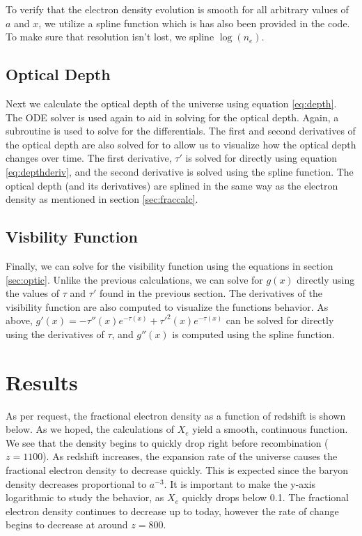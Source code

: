 \documentclass[twoside]{article}
\begin{document}
To verify that the electron density evolution is smooth for all arbitrary values of $a$ and $x$, we utilize a spline function which is has also been provided in the code. To make sure that resolution isn't lost, we spline $\log(n_e)$.

\subsection{Optical Depth}\label{sec:optcalc}

Next we calculate the optical depth of the universe using equation \ref{eq:depth}. The ODE solver is used again to aid in solving for the optical depth. Again, a subroutine is used to solve for the differentials. The first and second derivatives of the optical depth are also solved for to allow us to visualize how the optical depth changes over time. The first derivative, $\tau'$ is solved for directly using equation \ref{eq:depthderiv}, and the second derivative is solved using the spline function. The optical depth (and its derivatives) are splined in the same way as the electron density as mentioned in section \ref{sec:fraccalc}.

\clearpage

\subsection{Visbility Function}\label{sec:viscalc}

Finally, we can solve for the visibility function using the equations in section \ref{sec:optic}. Unlike the previous calculations, we can solve for $g(x)$ directly using the values of $\tau$ and $\tau'$ found in the previous section. The derivatives of the visibility function are also computed to visualize the functions behavior. As above, $g'(x) = -\tau''(x)e^{-\tau(x)}+\tau'^2(x)e^{-\tau(x)}$ can be solved for directly using the derivatives of $\tau$, and $g''(x)$ is computed using the spline function.

\clearpage

\section{Results}\label{sec:results}

As per request, the fractional electron density as a function of redshift is shown below. As we hoped, the calculations of $X_e$ yield a smooth, continuous function. We see that the density begins to quickly drop right before recombination ($z = 1100$). As redshift increases, the expansion rate of the universe causes the fractional electron density to decrease quickly. This is expected since the baryon density decreases proportional to $a^{-3}$. It is important to make the y-axis logarithmic to study the behavior, as $X_e$ quickly drops below 0.1. The fractional electron density continues to decrease up to today, however the rate of change begins to decrease at around $z=800$.
\end{document}
